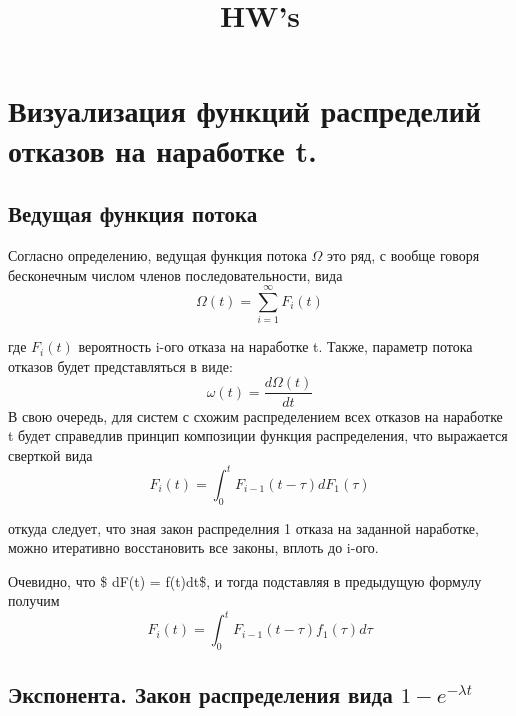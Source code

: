\documentclass[11pt]{article}
\title{HW's}
\begin{document}
    
    
    \maketitle
    
    

    
    \section{Визуализация функций распределий отказов на наработке
t.}\label{ux432ux438ux437ux443ux430ux43bux438ux437ux430ux446ux438ux44f-ux444ux443ux43dux43aux446ux438ux439-ux440ux430ux441ux43fux440ux435ux434ux435ux43bux438ux439-ux43eux442ux43aux430ux437ux43eux432-ux43dux430-ux43dux430ux440ux430ux431ux43eux442ux43aux435-t.}

\subsection{Ведущая функция
потока}\label{ux432ux435ux434ux443ux449ux430ux44f-ux444ux443ux43dux43aux446ux438ux44f-ux43fux43eux442ux43eux43aux430}

    Согласно определению, ведущая функция потока \(\Omega\) это ряд, с
вообще говоря бесконечным числом членов последовательности, вида
\[ \Omega(t) = \sum_{i = 1}^{\infty} F_i(t)\]

    где \(F_i(t)\) вероятность i-ого отказа на наработке t. Также, параметр
потока отказов будет представляться в виде:
\[ \omega(t) = \frac{d\Omega(t)}{dt}\]В свою очередь, для систем с
схожим распределением всех отказов на наработке t будет справедлив
принцип композиции функция распределения, что выражается сверткой вида
\[ F_i(t) = \int_{0}^{t}F_{i-1}(t - \tau)dF_1(\tau)\]

    откуда следует, что зная закон распределния 1 отказа на заданной
наработке, можно итеративно восстановить все законы, вплоть до i-ого.

Очевидно, что \$ dF(t) = f(t)dt\$, и тогда подставляя в предыдущую
формулу получим
\[ F_i(t) = \int_{0}^{t}F_{i-1}(t - \tau)f_1(\tau)d\tau\]

    \subsection{\texorpdfstring{Экспонента. Закон распределения вида
\(1 - e^{-\lambda t}\)}{Экспонента. Закон распределения вида 1 - e\^{}\{-\textbackslash{}lambda t\}}}\label{ux44dux43aux441ux43fux43eux43dux435ux43dux442ux430.-ux437ux430ux43aux43eux43d-ux440ux430ux441ux43fux440ux435ux434ux435ux43bux435ux43dux438ux44f-ux432ux438ux434ux430-1---e-lambda-t}
\end{document}
